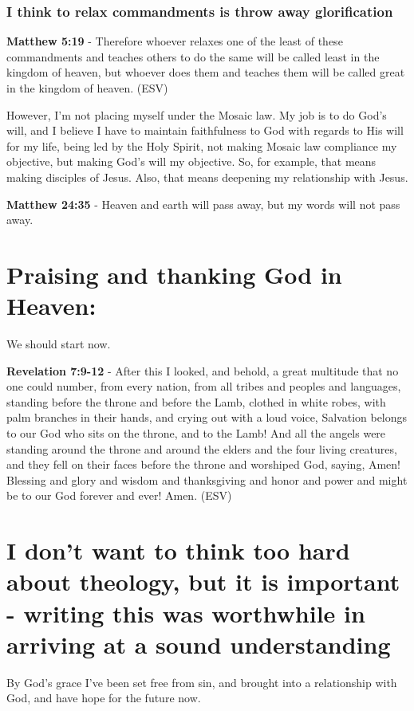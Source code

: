 \documentclass[11pt]{article}
\begin{document}
\subsubsection{I think to relax commandments is throw away glorification}
\label{sec:org4a3fd18}
\textbf{Matthew 5:19} - Therefore whoever relaxes one of the least of these commandments and teaches others to do the same will be called least in the kingdom of heaven, but whoever does them and teaches them will be called great in the kingdom of heaven. (ESV)

However, I'm not placing myself under the Mosaic law.
My job is to do God's will, and I believe I have to maintain faithfulness to God with regards to His will for my life,
being led by the Holy Spirit, not making Mosaic law compliance my objective, but making God's will my objective.
So, for example, that means making disciples of Jesus.
Also, that means deepening my relationship with Jesus.

\textbf{Matthew 24:35} - Heaven and earth will pass away, but my words will not pass away.

\section{Praising and thanking God in Heaven:}
\label{sec:orgf82a408}
We should start now.

\textbf{Revelation 7:9-12} -   After this I looked, and behold, a great multitude that no one could number, from every nation, from all tribes and peoples and languages, standing before the throne and before the Lamb, clothed in white robes, with palm branches in their hands, and crying out with a loud voice, Salvation belongs to our God who sits on the throne, and to the Lamb! And all the angels were standing around the throne and around the elders and the four living creatures, and they fell on their faces before the throne and worshiped God, saying, Amen! Blessing and glory and wisdom and thanksgiving and honor and power and might be to our God forever and ever! Amen.  (ESV)

\section{I don't want to think too hard about theology, but it is important - writing this was worthwhile in arriving at a sound understanding}
\label{sec:org1c222a0}
By God's grace I've been set free from sin, and brought into a relationship with God, and have hope for the future now.
\end{document}
